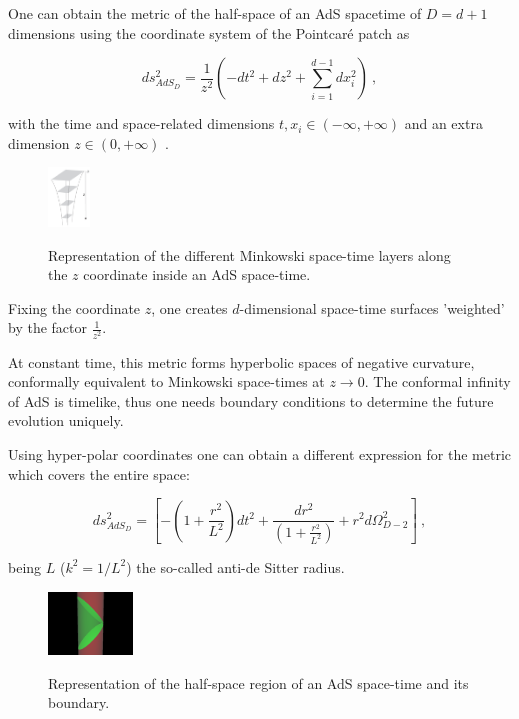 \documentclass[twocolumn]{revtex4}
\providecommand{\eq}[2]{
    \begin{equation}
        #2
    \label{eq:#1}
    \end{equation}
}
\begin{document}
One can obtain the metric of the half-space of an AdS spacetime of $D=d+1$ dimensions using the coordinate system of the Pointcaré patch as
\eq{AdS_PP-metric}{
    ds_{AdS_D}^2 = \frac{1}{z^2} \left( -dt^2 + dz^2 + \sum_{i=1}^{d-1} dx_i^2 \right) \ ,
}
with the time and space-related dimensions $t , x_i \in (-\infty,+\infty)$ and an extra dimension $z \in (0,+\infty)$ \cite{kaplan_lectures_nodate}.

\begin{figure}
    \centering
    \includegraphics[width=0.1\textwidth]{../Imatges/Extern/Captura_Superficies_z.png}
    \label{fig:AdS_z-surfaces}
    \caption{Representation of the different Minkowski space-time layers along the $z$ coordinate inside an AdS space-time.}
\end{figure}

Fixing the coordinate $z$, one creates $d$-dimensional space-time surfaces 'weighted' by the factor $\frac{1}{z^2}$.

At constant time, \cite{} this metric forms hyperbolic spaces of negative curvature, conformally equivalent to Minkowski space-times at $z \to 0$. The conformal infinity of AdS is timelike, thus one needs boundary conditions to determine the future evolution uniquely.

Using hyper-polar coordinates one can obtain a different expression for the metric which covers the entire space:
\eq{AdS_hyper-polar-metric}{
    ds_{AdS_D}^2 = \left [ - \left ( 1 + \frac{r^2}{L^2} \right ) dt^2 + \frac{dr^2}{\left ( 1+ \frac{r^2}{L^2} \right )} + r^2 d \Omega_{D-2}^2 \right ] \ ,
}
being $L$ ($k^2=1/L^2$) the so-called anti-de Sitter radius.

\begin{figure}
    \centering
    \includegraphics[width=0.2\textwidth]{../Imatges/Extern/Wikipedia_Half-space_Cilindric.png}
\label{fig:AdS_cylindrical}
\caption{Representation of the half-space region of an AdS space-time and its boundary.}
\end{figure}
\end{document}
